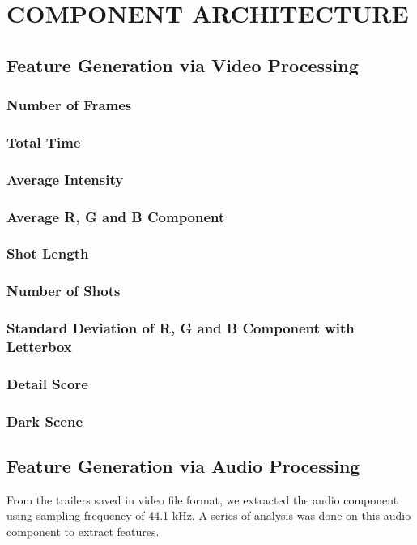 \documentclass[letterpaper, 10 pt, conference]{ieeeconf}  %
\begin{document}
\section{COMPONENT ARCHITECTURE}
\subsection{Feature Generation via Video Processing}
\subsubsection{Number of Frames}
\subsubsection{Total Time}
\subsubsection{Average Intensity}
\subsubsection{Average R, G and B Component}
\subsubsection{Shot Length}
\subsubsection{Number of Shots}
\subsubsection{Standard Deviation of R, G and B Component with Letterbox}
\subsubsection{Detail Score}
\subsubsection{Dark Scene}

\subsection{Feature Generation via Audio Processing}
From the trailers saved in video file format, we extracted the audio component using sampling frequency of 44.1 kHz. A series of analysis was done on this audio component to extract features.
\end{document}
